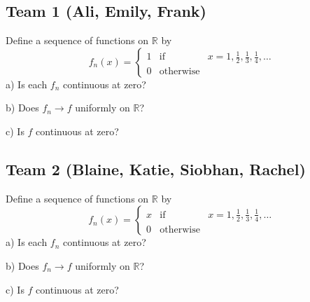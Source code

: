\subsection*{Team 1 (Ali, Emily, Frank)} 
\par\vspace{1 cm}
\begin{problem*}
Define a sequence of functions on $\mathbb{R}$ by
\[
f_n(x) = \left\{\begin{array}{lcl}
1 &\mbox{if}& x = 1,\frac{1}{2},\frac{1}{3},\frac{1}{4},\ldots\\
0 &\mbox{otherwise}\end{array}\right.
\]
a) Is each $f_n$ continuous at zero?
\par\vspace{0.3 cm}\noindent
b) Does $f_n\rightarrow f$ uniformly on $\mathbb{R}$?
\par\vspace{0.3 cm}\noindent
c) Is $f$ continuous at zero?
\end{problem*}

\subsection*{Team 2 (Blaine, Katie, Siobhan, Rachel)} 
\par\vspace{1 cm}
\begin{problem*}
Define a sequence of functions on $\mathbb{R}$ by
\[
f_n(x) = \left\{\begin{array}{lcl}
x &\mbox{if}& x = 1,\frac{1}{2},\frac{1}{3},\frac{1}{4},\ldots\\
0 &\mbox{otherwise}\end{array}\right.
\]
a) Is each $f_n$ continuous at zero?
\par\vspace{0.3 cm}\noindent
b) Does $f_n\rightarrow f$ uniformly on $\mathbb{R}$?
\par\vspace{0.3 cm}\noindent
c) Is $f$ continuous at zero?
\end{problem*}



